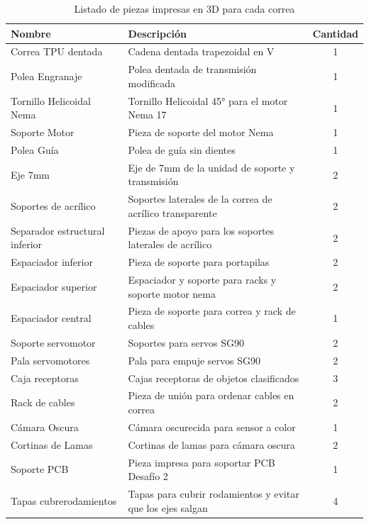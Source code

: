 \begin{table}[H]
    \centering
    \caption{Listado de piezas impresas en 3D para cada correa}
    \begin{tabular}{|l|l|c|}
        \hline
        \textbf{Nombre} & \textbf{Descripción} & \textbf{Cantidad} \\
        \hline
        Correa TPU dentada & Cadena dentada trapezoidal en V & 1 \\
        \hline
        Polea Engranaje & Polea dentada de transmisión modificada & 1 \\
        \hline
        Tornillo Helicoidal Nema & Tornillo Helicoidal 45° para el motor Nema 17 & 1 \\
        \hline
        Soporte Motor & Pieza de soporte del motor Nema & 1 \\
        \hline
        Polea Guía & Polea de guía sin dientes & 1 \\
        \hline
        Eje 7mm & Eje de 7mm de la unidad de soporte y transmisión & 2 \\
        \hline
        Soportes de acrílico & Soportes laterales de la correa de acrílico transparente & 2 \\
        \hline
        Separador estructural inferior & Piezas de apoyo para los soportes laterales de acrílico & 2 \\
        \hline
        Espaciador inferior & Pieza de soporte para portapilas & 2 \\
        \hline
        Espaciador superior & Espaciador y soporte para racks y soporte motor nema & 2 \\
        \hline
        Espaciador central & Pieza de soporte para correa y rack de cables & 1 \\
        \hline
        Soporte servomotor & Soportes para servos SG90 & 2 \\
        \hline
        Pala servomotores & Pala para empuje servos SG90 & 2 \\
        \hline
        Caja receptoras & Cajas receptoras de objetos clasificados & 3 \\
        \hline
        Rack de cables & Pieza de unión para ordenar cables en correa & 2 \\
        \hline
        Cámara Oscura & Cámara oscurecida para sensor a color & 1 \\
        \hline
        Cortinas de Lamas & Cortinas de lamas para cámara oscura & 2 \\
        \hline
        Soporte PCB & Pieza impresa para soportar PCB Desafío 2 & 1 \\
        \hline
        Tapas cubrerodamientos & Tapas para cubrir rodamientos y evitar que los ejes salgan & 4 \\
        \hline

    \end{tabular}
    \label{tab:2-piezas}
\end{table}


